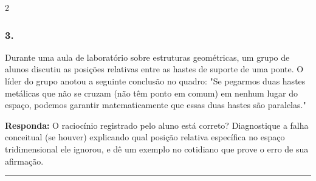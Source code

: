 \documentclass[twoside, 10pt, a4paper]{article}
\newlength{\espacoPreQuestao}\setlength{\espacoPreQuestao}{0.1cm}
\newlength{\espacoQuestao}\setlength{\espacoQuestao}{0.2cm}
\begin{document}
\begin{multicols*}{2}
\subsubsection*{3.} Durante uma aula de laboratório sobre estruturas geométricas, um grupo de alunos discutiu as posições relativas entre as hastes de suporte de uma ponte. O líder do grupo anotou a seguinte conclusão no quadro: "Se pegarmos duas hastes metálicas que não se cruzam (não têm ponto em comum) em nenhum lugar do espaço, podemos garantir matematicamente que essas duas hastes são paralelas."
\begin{boxresponda}
\textbf{Responda:} O raciocínio registrado pelo aluno está correto? Diagnostique a falha conceitual (se houver) explicando qual posição relativa específica no espaço tridimensional ele ignorou, e dê um exemplo no cotidiano que prove o erro de sua afirmação.
\end{boxresponda}
\par\vspace{\espacoQuestao}

\noindent\textcolor{CorLinha}{\rule{\linewidth}{0.5pt}} 
\par\vspace{\espacoPreQuestao}

\end{multicols*}
\end{document}
